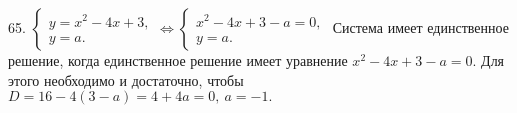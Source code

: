 65. $\begin{cases} y=x^2-4x+3,\\ y=a.\end{cases}\Leftrightarrow
\begin{cases} x^2-4x+3-a=0,\\ y=a.\end{cases}$ Система имеет единственное решение, когда единственное решение имеет уравнение $x^2-4x+3-a=0.$ Для этого необходимо и достаточно, чтобы $D=16-4(3-a)=4+4a=0,\ a=-1.$\\
